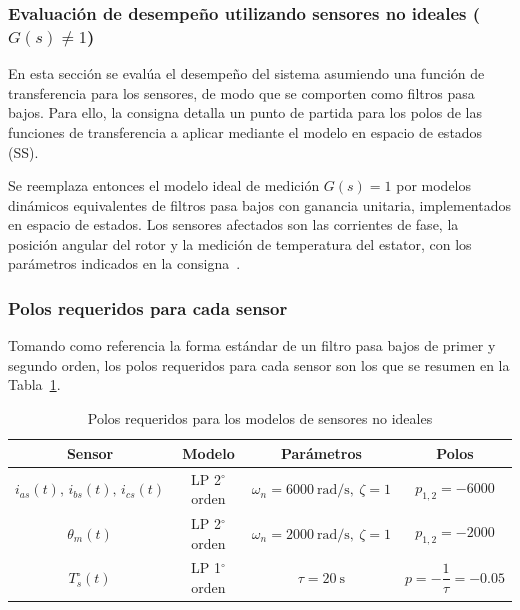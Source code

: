 \documentclass[12pt, a4paper,journal, onecolumn, compsoc]{IEEEtran}
\begin{document}
\subsubsection{Evaluación de desempeño utilizando sensores no ideales ($G(s)\neq 1$)}
En esta sección se evalúa el desempeño del sistema asumiendo una función de transferencia para los sensores, de modo que se comporten como filtros pasa bajos. Para ello, la consigna detalla un punto de partida para los polos de las funciones de transferencia a aplicar mediante el modelo en espacio de estados (SS).

Se reemplaza entonces el modelo ideal de medición $G(s)=1$ por modelos dinámicos equivalentes de filtros pasa bajos con ganancia unitaria, implementados en espacio de estados. Los sensores afectados son las corrientes de fase, la posición angular del rotor y la medición de temperatura del estator, con los parámetros indicados en la consigna~\cite{guia_trabajo}.

\subsubsection*{Polos requeridos para cada sensor}

Tomando como referencia la forma estándar de un filtro pasa bajos de primer y segundo orden, los polos requeridos para cada sensor son los que se resumen en la Tabla~\ref{tab:polos_sensores}.

\begin{table}[H]
    \centering
    \caption{Polos requeridos para los modelos de sensores no ideales}
    \label{tab:polos_sensores}
    \begin{tabular}{|c|c|c|c|}
        \hline
        \textbf{Sensor} & \textbf{Modelo} & \textbf{Parámetros} & \textbf{Polos} \\
        \hline
        $i_{as}(t),\,i_{bs}(t),\,i_{cs}(t)$ 
        & LP 2$^\circ$ orden 
        & $\omega_n=6000\ \text{rad/s},\ \zeta=1$ 
        & $p_{1,2}=-6000$ \\
        \hline
        $\theta_m(t)$ 
        & LP 2$^\circ$ orden 
        & $\omega_n=2000\ \text{rad/s},\ \zeta=1$ 
        & $p_{1,2}=-2000$ \\
        \hline
        $T_s^\circ(t)$ 
        & LP 1$^\circ$ orden 
        & $\tau=20\ \text{s}$ 
        & $p=-\dfrac{1}{\tau}=-0.05$ \\
        \hline
    \end{tabular}
\end{table}
\end{document}
